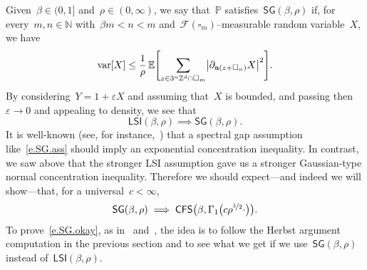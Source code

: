 \documentclass[11pt,twoside]{article} %
\let\oldsquare\square %
\renewcommand{\square}{\oldsquare}
\numberwithin{equation}{section}
\theoremstyle{definition}
\let\originalleft\left
\let\originalright\right
\renewcommand{\left}{\mathopen{}\mathclose\bgroup\originalleft}
\renewcommand{\right}{\aftergroup\egroup\originalright}
\newcommand*{\N}{\ensuremath{\mathbb{N}}}
\newcommand*{\Zd}{\ensuremath{\mathbb{Z}^d}}
\newcommand{\eps}{\varepsilon}
\newcommand{\ep}{\eps}
\renewcommand{\a}{\mathbf{a}}
\newcommand{\cu}{\square}
\newcommand{\F}{\mathcal{F}}
\renewcommand{\P}{\mathbb{P}}
\newcommand{\E}{\mathbb{E}}
\DeclareMathOperator{\var}{var}
\newcommand{\CFS}{\mathsf{CFS}}
\newcommand{\LSI}{\mathsf{LSI}}
\newcommand{\SG}{\mathsf{SG}}
\begin{document}
Given~$\beta\in (0,1]$ and~$\rho\in (0,\infty)$, we say that~$\P$ satisfies~$\SG(\beta,\rho)$ if, for every~$m,n\in\N$ with~$\beta m  < n < m$ and~$\F(\cu_m)$--measurable random variable~$X$, we have 
\begin{equation} 
\label{e.SG.ass}
\var\left[  X \right]
\leq 
\frac1\rho\,
\E \Biggl[
\sum_{z\in 3^n\Zd \cap \cu_m}
\left| \partial_{\a(z+\cu_n)} X
\right|^2
\Biggr]. 
\end{equation}
By considering~$Y = 1 + \ep X$ and assuming that~$X$ is bounded, and passing then~$\ep \to 0$ and appealing to density, we see that
\begin{equation*} \label{}
\LSI(\beta,\rho) \implies \SG(\beta,\rho).
\end{equation*}
It is well-known (see, for instance,~\cite{L}) that a spectral gap assumption like~\eqref{e.SG.ass} should imply an exponential concentration inequality. In contrast, we saw above that the stronger LSI assumption gave us a stronger Gaussian-type normal concentration inequality. Therefore we should expect---and indeed we will show---that, for a universal~$c<\infty$, 
\begin{equation} 
\label{e.SG.okay}
\SG(\beta,\rho) \implies \CFS\bigl(\beta,\Gamma_1\bigl(c\rho^{\nicefrac12} \cdot \bigr)  \bigr).
\end{equation}
To prove~\eqref{e.SG.okay}, as in~\cite{AiS} and~\cite[Section 2]{L}, the idea is to follow the Herbst argument computation in the previous section and to see what we get if we use~$\SG(\beta,\rho)$ instead of~$\LSI(\beta,\rho)$. 

\smallskip
\end{document}
